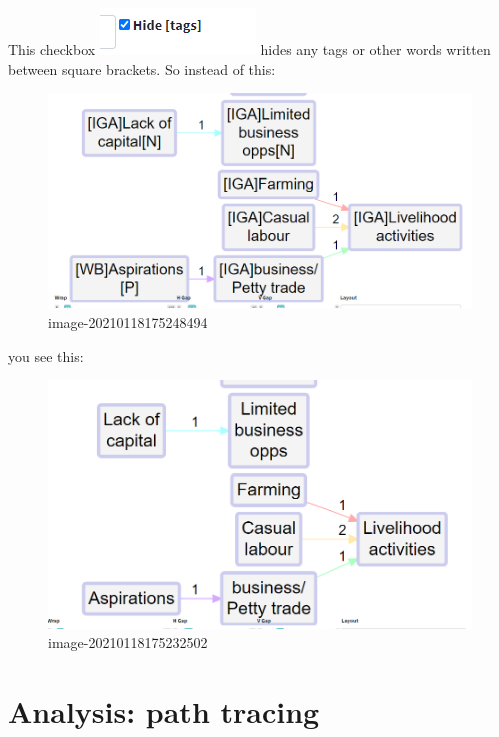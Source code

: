 \documentclass[
]{book}
\begin{document}
This checkbox \includegraphics{_assets/image-20210118175201822.png} hides any tags or other words written between square brackets. So instead of this:

\begin{figure}
\centering
\includegraphics{_assets/image-20210118175248494.png}
\caption{image-20210118175248494}
\end{figure}

you see this:

\begin{figure}
\centering
\includegraphics{_assets/image-20210118175232502.png}
\caption{image-20210118175232502}
\end{figure}

\hypertarget{tracing}{%
\chapter{Analysis: path tracing}\label{tracing}}
\end{document}
